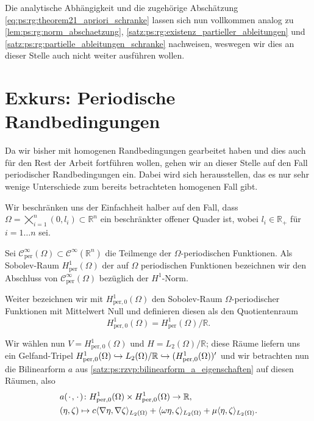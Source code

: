 \begin{Satz}
\begin{Beweis}
        Die analytische Abhängigkeit und die zugehörige Abschätzung \cref{eq:ps:rg:theorem21_apriori_schranke} lassen sich nun vollkommen analog zu \cref{lem:ps:rg:norm_abschaetzung}, \cref{satz:ps:rg:existenz_partieller_ableitungen} und \cref{satz:ps:rg:partielle_ableitungen_schranke} nachweisen, weswegen wir dies an dieser Stelle auch nicht weiter ausführen wollen.
    \end{Beweis}
\end{Satz}

\section{Exkurs: Periodische Randbedingungen} %
\label{sec:ps:pr:periodische_randbedingungen}

Da wir bisher mit homogenen Randbedingungen gearbeitet haben und dies auch für den Rest der Arbeit fortführen wollen, gehen wir an dieser Stelle auf den Fall periodischer Randbedingungen ein.
Dabei wird sich herausstellen, das es nur sehr wenige Unterschiede zum bereits betrachteten homogenen Fall gibt.

Wir beschränken uns der Einfachheit halber auf den Fall, dass $\Omega = \bigtimes_{i = 1}^{n} (0, l_{i}) \subset \mathbb{R}^{n}$ ein beschränkter offener Quader ist, wobei $l_{i} \in \mathbb{R}_{+}$ für $i = 1 \dots n$ sei.

\begin{Definition}
    Sei $\mathcal C_{\text{per}}^{\infty}(\Omega) \subset \mathcal C^{\infty}(\mathbb{R}^{n})$ die Teilmenge der $\Omega$-periodischen Funktionen.
    Als Sobolev-Raum $H^{1}_{\text{per}}(\Omega)$ der auf $\Omega$ periodischen Funktionen bezeichnen wir den Abschluss von $\mathcal C_{\text{per}}^{\infty}(\Omega)$ bezüglich der $H^{1}$-Norm.

    Weiter bezeichnen wir mit $H^{1}_{\text{per}, 0}(\Omega)$ den Sobolev-Raum $\Omega$-periodischer Funktionen mit Mittelwert Null und definieren diesen als den Quotientenraum
    \begin{equation}
        H^{1}_{\text{per}, 0}(\Omega) = H^{1}_{\text{per}}(\Omega) / \mathbb{R}.
    \end{equation}
\end{Definition}
%
%
Wir wählen nun $V = H^{1}_{\text{per}, 0}(\Omega)$ und $H = L_{2}(\Omega) / \mathbb{R}$; diese Räume liefern uns ein Gelfand-Tripel $H^{1}_{\text{per}, 0}(\Omega) \hookrightarrow L_{2}(\Omega) / \mathbb{R} \hookrightarrow (H^{1}_{\text{per}, 0}(\Omega))'$ und wir betrachten nun die Bilinearform $a$ aus \cref{satz:ps:rzvp:bilinearform_a_eigenschaften} auf diesen Räumen, also
\begin{equation}
    \begin{aligned}
        &a({\mkern2mu\cdot\mkern2mu}, {\mkern2mu\cdot\mkern2mu}) \colon H^{1}_{\text{per}, 0}(\Omega) \times H^{1}_{\text{per}, 0}(\Omega) \to \mathbb{R}, \\
        &(\eta, \zeta) \mapsto c\langle\nabla \eta,\nabla \zeta\rangle_{L_{2}(\Omega)} + \langle\omega \eta,\zeta\rangle_{L_{2}(\Omega)} + \mu \langle\eta,\zeta\rangle_{L_{2}(\Omega)}.
    \end{aligned}
\end{equation}

